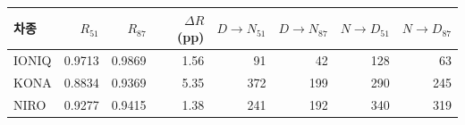 \begin{tabular}{lrrrrrrr}
\toprule
차종 & $R_{51}$ & $R_{87}$ & $\Delta R$ (pp) & $D\to N_{51}$ & $D\to N_{87}$ & $N\to D_{51}$ & $N\to D_{87}$ \\
\midrule
IONIQ & 0.9713 & 0.9869 & 1.56 & 91 & 42 & 128 & 63 \\
KONA & 0.8834 & 0.9369 & 5.35 & 372 & 199 & 290 & 245 \\
NIRO & 0.9277 & 0.9415 & 1.38 & 241 & 192 & 340 & 319 \\
\bottomrule
\end{tabular}

